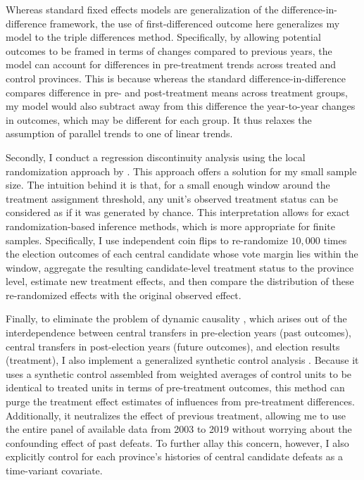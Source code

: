\documentclass[12pt]{article}
\newcommand{\1}{\mathbbm{1}}
\begin{document}
Whereas standard fixed effects models are generalization of the difference-in-difference framework, the use of first-differenced outcome here generalizes my model to the triple differences method. Specifically, by allowing potential outcomes to be framed in terms of changes compared to previous years, the model can account for differences in pre-treatment trends across treated and control provinces. This is because whereas the standard difference-in-difference compares difference in pre- and post-treatment means across treatment groups, my model would also subtract away from this difference the year-to-year changes in outcomes, which may be different for each group. It thus relaxes the assumption of parallel trends to one of linear trends.

Secondly, I conduct a regression discontinuity analysis using the local randomization approach by \citet{CattaneoTitiunik2015}. This approach offers a solution for my small sample size. The intuition behind it is that, for a small enough window around the treatment assignment threshold, any unit's observed treatment status can be considered as if it was generated by chance. This interpretation allows for exact randomization-based inference methods, which is more appropriate for finite samples. Specifically, I use independent coin flips to re-randomize $10,000$ times the election outcomes of each central candidate whose vote margin lies within the window, aggregate the resulting candidate-level treatment status to the province level, estimate new treatment effects, and then compare the distribution of these re-randomized effects with the original observed effect.

Finally, to eliminate the problem of dynamic causality \citep{ImaiKim2019}, which arises out of the interdependence between central transfers in pre-election years (past outcomes), central transfers in post-election years (future outcomes), and election results (treatment), I also implement a generalized synthetic control analysis \citep{Xu2017gsynth}. Because it uses a synthetic control assembled from weighted averages of control units to be identical to treated units in terms of pre-treatment outcomes, this method can purge the treatment effect estimates of influences from pre-treatment differences. Additionally, it neutralizes the effect of previous treatment, allowing me to use the entire panel of available data from 2003 to 2019 without worrying about the confounding effect of past defeats. To further allay this concern, however, I also explicitly control for each province's histories of central candidate defeats as a time-variant covariate. 
\end{document}
